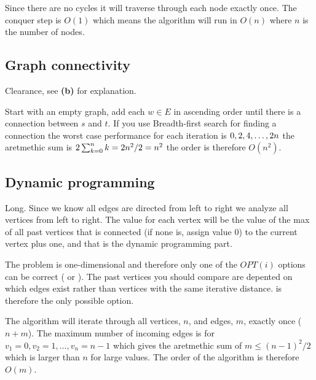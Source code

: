 \documentclass[a4paper]{article}
\newenvironment{task}[1]
{
	\begin{description}[align=right]
		\item [#1]
}{		%
	\end{description}
}
\newcommand{\taskref}[1]{\textbf{#1}}
\let\*\relax
\DeclareMathOperator{\*}{\cdot}
\begin{document}
\begin{task}{(c)}
	 Since there are no cycles it will traverse through each node exactly once. The conquer step is $O(1)$ which means the algorithm will run in $O(n)$ where $n$ is the number of nodes.
\end{task}

\subsection*{Graph connectivity}

\begin{task}{3. (a)}
	 Clearance, see \taskref{(b)} for explanation.
\end{task}

\begin{task}{(b)}
	\qquad Start with an empty graph, add each $w\in E$ in ascending order until there is a connection between $s$ and $t$. If you use Breadth-first search for finding a connection the worst case performance for each iteration is $0, 2, 4, \ldots , 2\*n$ the aretmethic sum is $2\sum_{k=0}^{n}k=2\*n^2/2=n^2$ the order is therefore $O(n^2)$.
\end{task}

\subsection*{Dynamic programming}

\begin{task}{4. (a)}
	 Long. Since we know all edges are directed from left to right we analyze all vertices from left to right. The value for each vertex will be the value of the max of all past vertices that is connected (if none is, assign value 0) to the current vertex plus one, and that is the dynamic programming part. 
\end{task}

\begin{task}{(b)}
	 The problem is one-dimensional and therefore only one of the $OPT(i)$ options can be correct ( or ). The past vertices you should compare are depented on which edges exist rather than vertices with the same iterative distance.  is therefore the only possible option. 
\end{task}

\begin{task}{(c)}
	 The algorithm will iterate through all vertices, $n$, and edges, $m$, exactly once ($n+m$). The maximum number of incoming edges is for $v_1=0, v_2=1, \ldots, v_n=n-1$ which gives the aretmethic sum of $m\leq (n-1)^2/2$ which is larger than $n$ for large values. The order of the algorithm is therefore $O(m)$.
\end{task}
\end{document}
